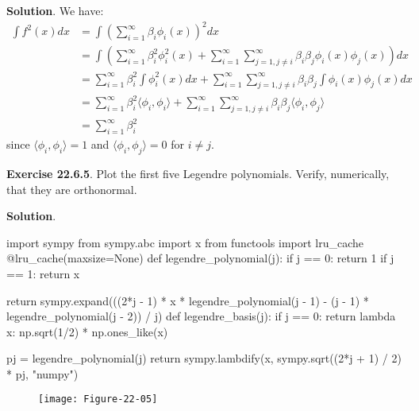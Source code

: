 \textbf{Solution}. We have:
\begin{align*}
\int f^{2}(x) dx &= \int \left( \sum_{i=1}^{\infty} \beta_{i} \phi_{i}(x) \right)^{2} dx \\
&= \int \left( \sum_{i=1}^{\infty} \beta_{i}^{2} \phi_{i}^{2}(x) + \sum_{i=1}^{\infty} \sum_{j=1, j \neq i}^{\infty} \beta_{i} \beta_{j} \phi_{i}(x) \phi_{j}(x) \right) dx \\
&= \sum_{i=1}^{\infty} \beta_{i}^{2} \int \phi_{i}^{2}(x) dx + \sum_{i=1}^{\infty} \sum_{j=1, j \neq i}^{\infty} \beta_{i} \beta_{j}  \int \phi_{i}(x) \phi_{j}(x) dx \\
&= \sum_{i=1}^{\infty} \beta_{i}^{2} \langle \phi_{i}, \phi_{i} \rangle + \sum_{i=1}^{\infty} \sum_{j=1, j \neq i}^{\infty} \beta_{i} \beta_{j} \langle \phi_{i}, \phi_{j} \rangle \\
&= \sum_{i=1}^{\infty} \beta_{i}^{2}
\end{align*}
since \(\langle \phi_{i}, \phi_{i} \rangle = 1\) and
\(\langle \phi_{i}, \phi_{j} \rangle = 0\) for \(i \neq j\).

\textbf{Exercise 22.6.5}. Plot the first five Legendre polynomials.
Verify, numerically, that they are orthonormal.

\textbf{Solution}.

\begin{python}
import sympy
from sympy.abc import x
from functools import lru_cache
@lru_cache(maxsize=None)
def legendre_polynomial(j):
    if j == 0:
        return 1
    if j == 1:
        return x
    
    return sympy.expand(((2*j - 1) * x * legendre_polynomial(j - 1) 
                        - (j - 1) * legendre_polynomial(j - 2)) / j)
def legendre_basis(j):
    if j == 0:
        return lambda x: np.sqrt(1/2) * np.ones_like(x)
    
    pj = legendre_polynomial(j)
    return sympy.lambdify(x, sympy.sqrt((2*j + 1) / 2) * pj, "numpy")
\end{python}


\begin{figure}[H]
\centering
\texttt{[image: Figure-22-05]}
\end{figure}


